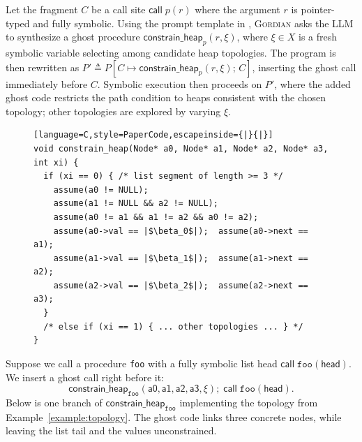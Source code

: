 \documentclass[acmsmall]{acmart}
\newcommand{\projName}{\textsc{Gordian}\xspace}
\theoremstyle{definition}
\begin{document}
Let the fragment \(C\) be a call site \(\mathsf{call}\;p(r)\) where the argument
\(r\) is pointer-typed and fully symbolic. Using the prompt template in
, \projName{} asks the LLM to synthesize a ghost
procedure \(\mathsf{constrain\_heap}_p(r,\xi)\), where \(\xi \in X\) is a fresh
symbolic variable selecting among candidate heap topologies. The program is then
rewritten as \(P' \triangleq P[C \mapsto \mathsf{constrain\_heap}_p(r,\xi);\,C]\),
inserting the ghost call immediately before \(C\).
Symbolic execution then proceeds on $P'$, where the added ghost code restricts
the path condition to heaps consistent with the chosen topology; other
topologies are explored by varying $\xi$.

\begin{figure}
\vspace{-4mm}
{\scriptsize
\begin{lstlisting}[language=C,style=PaperCode,escapeinside={|}{|}]
void constrain_heap(Node* a0, Node* a1, Node* a2, Node* a3, int xi) {
  if (xi == 0) { /* list segment of length >= 3 */
    assume(a0 != NULL);
    assume(a1 != NULL && a2 != NULL);
    assume(a0 != a1 && a1 != a2 && a0 != a2);
    assume(a0->val == |$\beta_0$|);  assume(a0->next == a1);
    assume(a1->val == |$\beta_1$|);  assume(a1->next == a2);
    assume(a2->val == |$\beta_2$|);  assume(a2->next == a3);
  }
  /* else if (xi == 1) { ... other topologies ... } */
}
\end{lstlisting}
}
\vspace{-4mm}
\end{figure}
\begin{example}
Suppose we call a procedure \texttt{foo} with a fully symbolic list head $\mathsf{call}\;\texttt{foo}(\mathsf{head}).$ We insert a ghost call right before it:
\[
\mathsf{constrain\_heap}_{\texttt{foo}}(\mathsf{a0},\mathsf{a1},\mathsf{a2},\mathsf{a3},\xi);\;
\mathsf{call}\;\texttt{foo}(\mathsf{head}).
\]
Below is one branch of $\mathsf{constrain\_heap}_{\texttt{foo}}$ implementing
the topology from Example~\ref{example:topology}. The ghost code links three concrete nodes, while leaving the list tail and the values unconstrained.
\end{example}
\end{document}
